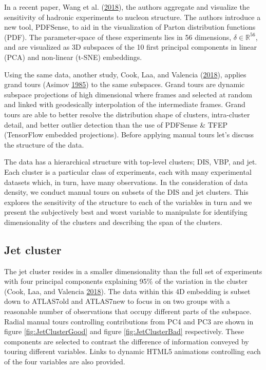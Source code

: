 In a recent paper, Wang et al.
(\protect\hyperlink{ref-wang_mapping_2018}{2018}), the authors aggregate
and visualize the sensitivity of hadronic experiments to nucleon
structure. The authors introduce a new tool, PDFSense, to aid in the
visualization of Parton distribution functions (PDF). The
parameter-space of these experiments lies in 56 dimensions,
\(\delta \in \mathbb{R}^{56}\), and are visualized as 3D subspaces of
the 10 first principal components in linear (PCA) and non-linear (t-SNE)
embeddings.

Using the same data, another study, Cook, Laa, and Valencia
(\protect\hyperlink{ref-cook_dynamical_2018}{2018}), applies grand tours
(Asimov \protect\hyperlink{ref-asimov_grand_1985}{1985}) to the same
subspaces. Grand tours are dynamic subspace projections of high
dimensional where frames and selected at random and linked with
geodesically interpolation of the intermediate frames. Grand tours are
able to better resolve the distribution shape of clusters, intra-cluster
detail, and better outlier detection than the use of PDFSense \& TFEP
(TensorFlow embedded projections). Before applying manual tours let's
discuss the structure of the data.

The data has a hierarchical structure with top-level clusters; DIS, VBP,
and jet. Each cluster is a particular class of experiments, each with
many experimental datasets which, in turn, have many observations. In
the consideration of data density, we conduct manual tours on subsets of
the DIS and jet clusters. This explores the sensitivity of the structure
to each of the variables in turn and we present the subjectively best
and worst variable to manipulate for identifying dimensionality of the
clusters and describing the span of the clusters.

\hypertarget{jet-cluster}{%
\subsection{Jet cluster}\label{jet-cluster}}

The jet cluster resides in a smaller dimensionality than the full set of
experiments with four principal components explaining 95\% of the
variation in the cluster (Cook, Laa, and Valencia
\protect\hyperlink{ref-cook_dynamical_2018}{2018}). The data within this
4D embedding is subset down to ATLAS7old and ATLAS7new to focus in on
two groups with a reasonable number of observations that occupy
different parts of the subspace. Radial manual tours controlling
contributions from PC4 and PC3 are shown in figure
\ref{fig:JetClusterGood} and figure \ref{fig:JetClusterBad}
respectively. These components are selected to contrast the difference
of information conveyed by touring different variables. Links to dynamic
HTML5 animations controlling each of the four variables are also
provided.

